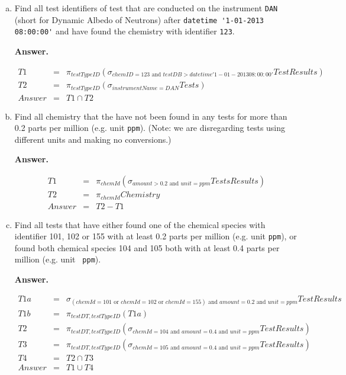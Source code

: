 \documentclass[11pt]{article}
\begin{document}
\begin{enumerate} [(a)]
\item Find all test identifiers of test that are conducted on the
  instrument \verb+DAN+ (short for Dynamic Albedo of Neutrons) after
  \verb+datetime '1-01-2013 08:00:00'+ and have found the chemistry
  with identifier \verb+123+.

{\bf Answer.}

\begin{eqnarray*}
T1 & = & \pi_{testTypeID} (\sigma_{chemID = 123 \mbox{ and } testDB > datetime '1-01-2013 08:00:00'} TestResults) \\
T2 & = & \pi_{testTypeID} (\sigma_{instrumentName = DAN} Tests) \\
Answer & = &  T1 \cap T2
\end{eqnarray*}

\item Find all chemistry that the have not been found in any tests for
  more than 0.2 parts per million (e.g. unit {\tt ppm}). (Note: we are
  disregarding tests using different units and making no conversions.)

{\bf Answer.}

\begin{eqnarray*}
T1 & = & \pi_{chemId} (\sigma_{amount>0.2 \mbox{ and } unit = ppm} TestsResults) \\
T2 & = & \pi_{chemId} Chemistry \\
Answer & = &  T2 - T1
\end{eqnarray*}

\item Find all tests that have either found one of the chemical
  species with identifier 101, 102 or 155 with at least 0.2 parts per
  million (e.g. unit {\tt ppm}), or found both chemical species 104
  and 105 both with at least 0.4 parts per million (e.g. unit {\tt
    ppm}).

{\bf Answer.}

\begin{eqnarray*}
T1a & = & \sigma_{(chemId=101 \mbox{ or } chemId=102 \mbox{ or } chemId=155) \mbox{ and } amount=0.2 \mbox{ and } unit = ppm } TestResults \\
T1b & = & \pi_{testDT, testTypeID} (T1a) \\
T2 & = & \pi_{testDT, testTypeID} (\sigma_{chemId=104 \mbox{ and } amount=0.4 \mbox{ and } unit = ppm } TestResults) \\
T3 & = & \pi_{testDT, testTypeID} (\sigma_{chemId=105 \mbox{ and } amount=0.4 \mbox{ and } unit = ppm } TestResults) \\
T4 & = & T2 \cap T3 \\
Answer & = &  T1 \cup T4
\end{eqnarray*}

\end{enumerate}
\end{document}
